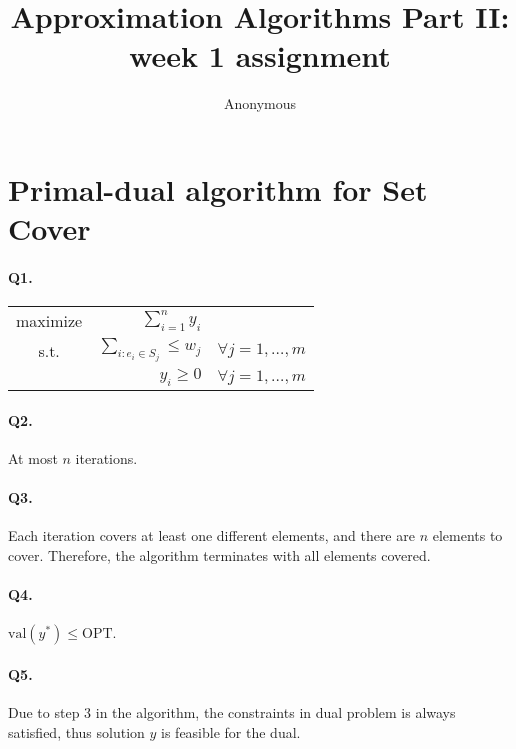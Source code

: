 \documentclass{article}
\begin{document}
\title{Approximation Algorithms Part II: week 1 assignment}
\author{Anonymous}

\maketitle

\newcommand{\abs}[1]{|#1|}

\section*{Primal-dual algorithm for Set Cover}

\paragraph{Q1. }

\begin{tabular}{crr}
  maximize  & $\sum_{i=1}^n y_i$ & \\
  s.t.      & $\sum_{i: e_i \in S_j} \le w_j$ & $\forall j=1,\ldots,m$ \\
            & $y_i \ge 0$ & $\forall j=1,\ldots,m$
\end{tabular}

\paragraph{Q2. }

At most $n$ iterations.

\paragraph{Q3. }

Each iteration covers at least one different elements, and there are $n$ elements to cover. Therefore, the algorithm terminates with all elements covered.

\paragraph{Q4. }

$\text{val}(y^*) \le \text{OPT}$. 

\paragraph{Q5. }

Due to step 3 in the algorithm, the constraints in dual problem is always satisfied, thus solution $y$ is feasible for the dual. 
\end{document}

